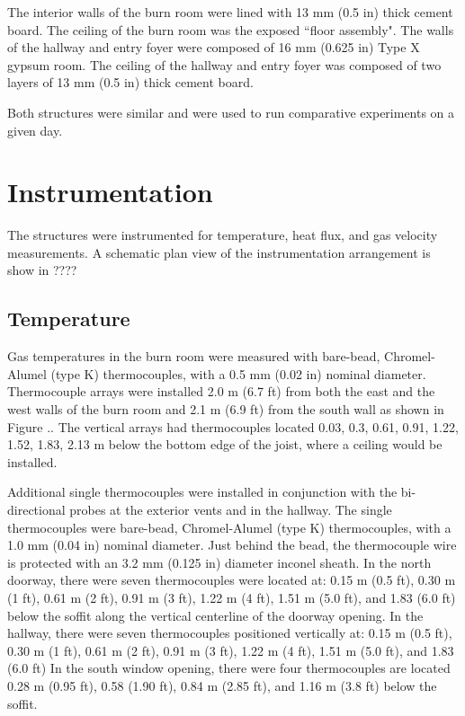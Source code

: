 \documentclass[12pt,oneside]{book}
\begin{document}
The interior walls of the burn room were lined with 13 mm (0.5 in) thick cement board.  The ceiling of the burn room was the exposed ``floor assembly".  The walls of the hallway and entry foyer were composed of 16 mm (0.625 in) Type X gypsum room. The ceiling of the hallway and entry foyer was composed of two layers of 13 mm (0.5 in) thick cement board.    

Both structures were similar and were used to run comparative experiments on a given day.

\section{Instrumentation}
\label{sec:Instrumentation}

The structures were instrumented for temperature, heat flux, and gas velocity measurements.  A schematic plan view of the instrumentation arrangement is show in ????  

\subsection{Temperature}
\label{subsec:Temperature}

Gas temperatures in the burn room were measured with bare-bead, Chromel-Alumel (type K) thermocouples, with a 0.5 mm (0.02 in) nominal diameter.  Thermocouple arrays were installed 2.0 m (6.7 ft) from both the east and the west walls of the burn room and 2.1 m (6.9 ft) from the south wall as shown in Figure ..  The vertical arrays had thermocouples located 0.03, 0.3, 0.61, 0.91, 1.22, 1.52, 1.83, 2.13 m below the bottom edge of the joist, where a ceiling would be installed.   

Additional single thermocouples were installed in conjunction with the bi-directional probes at the exterior vents and in the hallway.  The single thermocouples were bare-bead, Chromel-Alumel (type K) thermocouples, with a 1.0 mm (0.04 in) nominal diameter. Just behind the bead, the thermocouple wire is protected with an 3.2 mm (0.125 in) diameter inconel sheath.  
In the north doorway, there were seven thermocouples were located at: 0.15 m (0.5 ft), 0.30 m (1 ft), 0.61 m (2 ft), 0.91 m (3 ft), 1.22 m (4 ft), 1.51 m (5.0 ft), and 1.83 (6.0 ft) below the soffit along the vertical centerline of the doorway opening.  In the hallway, there were seven thermocouples positioned vertically at: 0.15 m (0.5 ft), 0.30 m (1 ft), 0.61 m (2 ft), 0.91 m (3 ft), 1.22 m (4 ft), 1.51 m (5.0 ft), and 1.83 (6.0 ft)   In the south window opening, there were four thermocouples are located 0.28 m (0.95 ft), 0.58 (1.90 ft), 0.84 m (2.85 ft), and 1.16 m (3.8 ft) below the soffit.  
\end{document}
